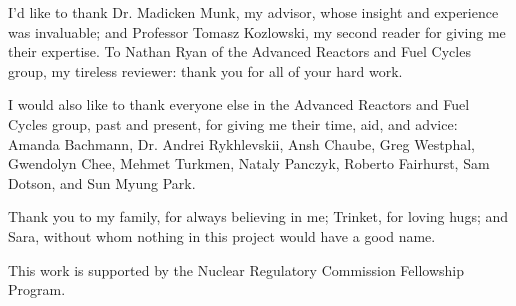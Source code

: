 I'd like to thank Dr. Madicken Munk, my advisor,  whose insight and experience was invaluable; and Professor Tomasz Kozlowski, my second reader for giving me their expertise.  To Nathan Ryan of the Advanced Reactors and Fuel Cycles group, my tireless reviewer: thank you for all of your hard work.  

I would also like to thank everyone else in the Advanced Reactors and Fuel Cycles group, past and present, for giving me their time, aid, and advice: Amanda Bachmann, Dr. Andrei Rykhlevskii, Ansh Chaube, Greg Westphal, Gwendolyn Chee, Mehmet Turkmen, Nataly Panczyk, Roberto Fairhurst, Sam Dotson, and Sun Myung Park.  

Thank you to my family, for always believing in me; Trinket, for loving hugs; and Sara, without whom nothing in this project would have a good name.


This work is supported by the Nuclear Regulatory Commission Fellowship Program.